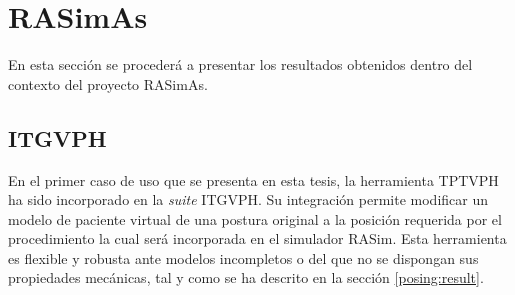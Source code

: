 \section{RASimAs}

En esta sección se procederá a presentar los resultados obtenidos dentro del contexto del proyecto \ac{RASimAs}. 

\subsection{ITGVPH}
\label{result:herramienta}

En el primer caso de uso que se presenta en esta tesis, la herramienta \ac{TPTVPH} ha sido incorporado en la \emph{suite} \ac{ITGVPH}. Su integración permite modificar un modelo de paciente virtual de una postura original a la posición requerida por el procedimiento\new{,} la cual será incorporada en el simulador \ac{RASim}. Esta herramienta es flexible y robusta ante modelos incompletos o del que no se dispongan sus propiedades mecánicas, tal y como se ha descrito en la sección \ref{posing:result}. 






